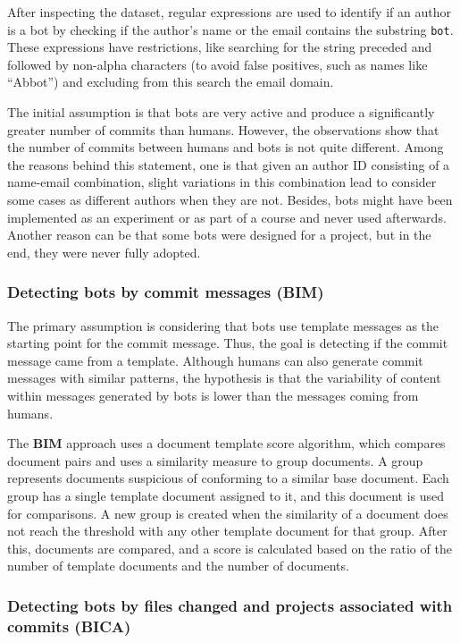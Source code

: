 \documentclass[a4paper, 12pt]{book}
\begin{document}
After inspecting the dataset, regular expressions are used to identify if an author is a bot by checking if the author's name or the email contains the substring \texttt{bot}. These expressions have restrictions, like searching for the string preceded and followed by non-alpha characters (to avoid false positives, such as names like ``Abbot'') and excluding from this search the email domain.

The initial assumption is that bots are very active and produce a significantly greater number of commits than humans. However, the observations show that the number of commits between humans and bots is not quite different. Among the reasons behind this statement, one is that given an author ID consisting of a name-email combination, slight variations in this combination lead to consider some cases as different authors when they are not. Besides, bots might have been implemented as an experiment or as part of a course and never used afterwards. Another reason can be that some bots were designed for a project, but in the end, they were never fully adopted.

\subsubsection{Detecting bots by commit messages (BIM)}
\label{sssec:dey-bim}

The primary assumption is considering that bots use template messages as the starting point for the commit message. Thus, the goal is detecting if the commit message came from a template. Although humans can also generate commit messages with similar patterns, the hypothesis is that the variability of content within messages generated by bots is lower than the messages coming from humans.

The \textbf{BIM} approach uses a document template score algorithm, which compares document pairs and uses a similarity measure to group documents. A group represents documents suspicious of conforming to a similar base document. Each group has a single template document assigned to it, and this document is used for comparisons. A new group is created when the similarity of a document does not reach the threshold with any other template document for that group. After this, documents are compared, and a score is calculated based on the ratio of the number of template documents and the number of documents. 

\subsubsection{Detecting bots by files changed and projects associated with commits (BICA)}
\label{sssec:dey-bica}
\end{document}
